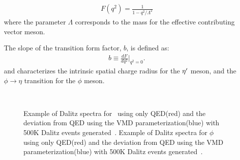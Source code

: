   \begin{align}
  F(q^2) = \frac{1}{1-q^2/\Lambda^2} 
  \end{align}
   where the parameter $\Lambda$ corresponds to the mass for the effective contributing vector meson.

 The slope of the transition form factor, $b$, is defined as:
\begin{align}
b \equiv \frac{dF}{dq^2}|_{q^2=0}.
\end{align}
and characterizes the intrinsic spatial charge radius for the $\eta^{\prime}$ meson, and the $\phi \to \eta$ transition for the $\phi$ meson.




 \begin{figure}[h!]\begin{center}
 		\\
 		\caption[Dalitz  for \etaTP \ and $\phi$]{\label{fig:dalitz_compare}Example of Dalitz spectra for \etaTP \ using only QED(red) and the deviation from QED using the VMD parameterization(blue) with 500K Dalitz events generated~.  Example of Dalitz  spectra for $\phi$ using only QED(red) and the deviation from QED using the VMD parameterization(blue)  with 500K Dalitz events generated~. }
 	\end{center}\end{figure}
\FloatBarrier 	 
